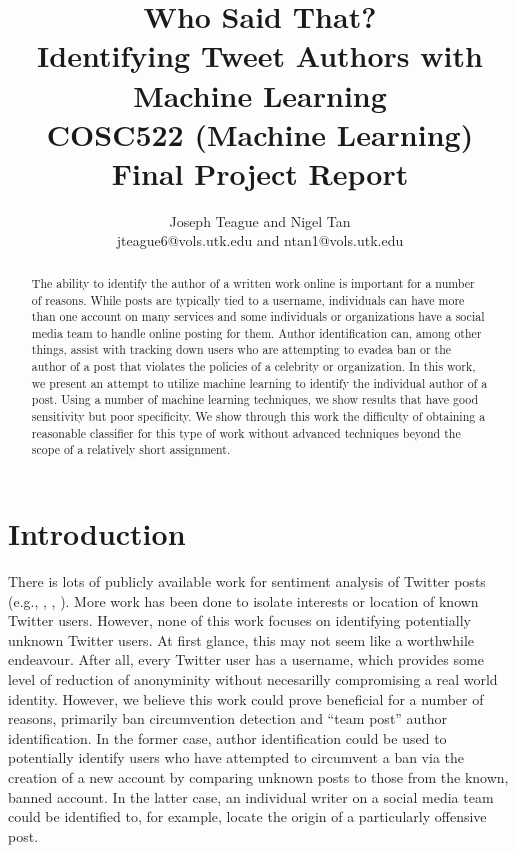 \documentclass[letter,11pt,titlepage]{article}
\begin{document}
\title{Who Said That?\\ \normalsize{Identifying Tweet Authors with Machine Learning}\\ \small{COSC522 (Machine Learning) Final Project Report}}
\author{Joseph Teague and Nigel Tan\\ \small{jteague6@vols.utk.edu and ntan1@vols.utk.edu}}
\maketitle

\begin{abstract}

    The ability to identify the author of a written work online is important for a number of reasons. While posts are typically tied to a username, individuals can have more than one account on many services and some individuals or organizations have a social media team to handle online posting for them. Author identification can, among other things, assist with tracking down users who are attempting to evadea ban or the author of a post that violates the policies of a celebrity or organization. In this work, we present an attempt to utilize machine learning to identify the individual author of a post. Using a number of machine learning techniques, we show results that have good sensitivity but poor specificity. We show through this work the difficulty of obtaining a reasonable classifier for this type of work without advanced techniques beyond the scope of a relatively short assignment.

\end{abstract}

\section{Introduction}

There is lots of publicly available work for sentiment analysis of Twitter posts (e.g., \cite{TSA1}, \cite{TSA2}, \cite{TSA3}). More work has been done to isolate interests \cite{TIA1} or location \cite{TLA1} of known Twitter users. However, none of this work focuses on identifying potentially unknown Twitter users. At first glance, this may not seem like a worthwhile endeavour. After all, every Twitter user has a username, which provides some level of reduction of anonyminity without necesarilly compromising a real world identity. However, we believe this work could prove beneficial for a number of reasons, primarily ban circumvention detection and ``team post'' author identification. In the former case, author identification could be used to potentially identify users who have attempted to circumvent a ban via the creation of a new account by comparing unknown posts to those from the known, banned account. In the latter case, an individual writer on a social media team could be identified to, for example, locate the origin of a particularly offensive post.
\end{document}
